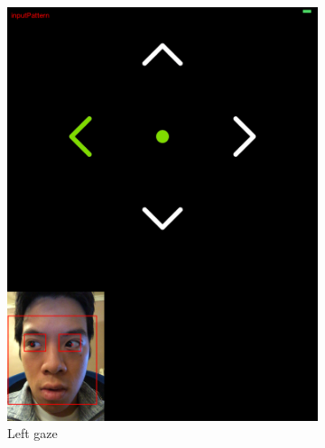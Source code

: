 \documentclass[10pt,twocolumn,letterpaper]{article}
\begin{document}
\begin{figure}[H]
\begin{subfigure}[t]{0.33\linewidth}
        \includegraphics[scale=0.045]{pattern_left}
        \caption{Left gaze}
    \end{subfigure}%
    ~ 
    \begin{subfigure}[t]{0.33\linewidth}
        \centering

\end{subfigure}
\end{figure}
\end{document}
